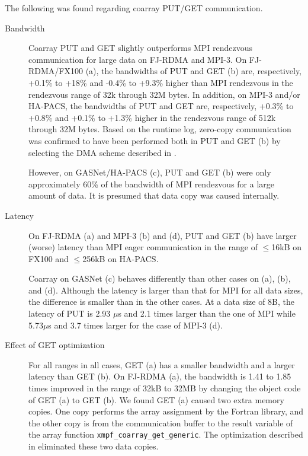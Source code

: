 
The following was found regarding coarray PUT/GET communication.

\begin{description}

\item [Bandwidth]
Coarray PUT and GET slightly outperforms MPI rendezvous communication for large data 
on FJ-RDMA and MPI-3.
On FJ-RDMA/FX100 (a), the bandwidths of PUT and GET (b) are, respectively, 
+0.1\% to +18\% and -0.4\% to +9.3\% higher than MPI rendezvous in the 
rendezvous range of 32k through 32M bytes.
In addition, on MPI-3 and/or HA-PACS, the bandwidths of PUT and GET are, respectively, +0.3\% to +0.8\% and 
+0.1\% to +1.3\% higher in the rendezvous range of 512k through 32M bytes.
Based on the runtime log, zero-copy communication was confirmed to have been performed
both in PUT and GET (b) by selecting the DMA scheme described in .

However, on GASNet/HA-PACS (c), PUT and GET (b) were only approximately 60\% of the bandwidth of MPI rendezvous for a large amount of data.
It is presumed that data copy was caused internally.

\item [Latency]
On FJ-RDMA (a) and MPI-3 (b) and (d), PUT and GET (b) have larger (worse) latency than 
MPI eager communication in the range of $\leq$16kB on FX100 and $\leq$256kB on HA-PACS.

Coarray on GASNet (c) behaves differently than other cases on (a), (b), and (d).
Although the latency is larger than that for MPI for all data sizes, the difference
is smaller than in the other cases. At a data size of 8B, the latency of PUT is 2.93 $\mu$s
and 2.1 times larger than the one of MPI 
while 5.73$\mu$s and 3.7 times larger for the case of MPI-3 (d).

\item [Effect of GET optimization]
For all ranges in all cases, GET (a) has a smaller bandwidth and a larger latency than GET (b).
On FJ-RDMA (a), the bandwidth is 1.41 to 1.85 times improved in the range of 32kB to 32MB
by changing the object code of GET (a) to GET (b).
We found GET (a) caused two extra memory copies. One copy performs the array assignment 
by the Fortran library, and the other copy is from the communication buffer 
to the result variable of the array function {\tt xmpf\_coarray\_get\_generic}. 
The optimization described in  eliminated these two data copies.

\end{description}

